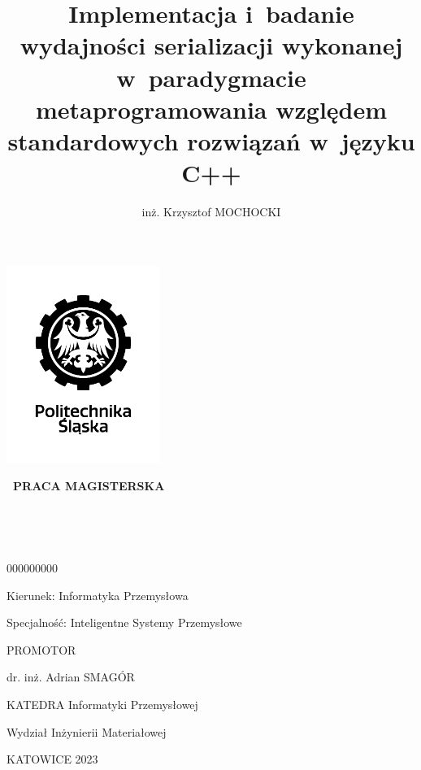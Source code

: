 \documentclass[12pt]{article}
\title{Implementacja i~badanie wydajności serializacji wykonanej w~paradygmacie metaprogramowania względem standardowych rozwiązań w~języku C++}
\author{inż. Krzysztof MOCHOCKI}
\date{}
\begin{document}
	\renewcommand*\listfigurename{}
	\renewcommand*\listoftables{}

	\begin{titlepage}
		\clearpage
		\centering

		\includegraphics[width=5cm, keepaspectratio=true]{./img/black_and_white_polsl_logo.png}

		{\LARGE\bfseries\ PRACA MAGISTERSKA}

		\vspace*{1cm}

		{\LARGE \MyTitle}

		\Large\bfseries\

		\begin{spacing}{1.125}
			\MyAuthor\

			000000000
			\vspace*{1cm}

			Kierunek: Informatyka Przemysłowa

			Specjalność: Inteligentne Systemy Przemysłowe

			\vspace*{1cm}

			PROMOTOR

			dr. inż. Adrian SMAGÓR

			\vspace*{0.5cm}

			KATEDRA Informatyki Przemysłowej

			Wydział Inżynierii Materiałowej

			\vspace*{\vfill}

			KATOWICE 2023
		\end{spacing}

		\thispagestyle{empty}
	\end{titlepage}
\end{document}
